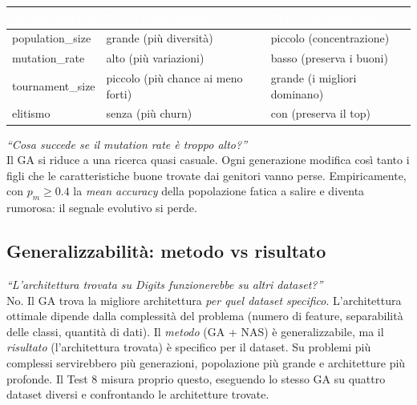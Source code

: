 \documentclass[11pt,a4paper]{article}
\begin{document}
\begin{center}
\begin{tabular}{p{3.4cm} p{4.6cm} p{4.6cm}}
    \toprule
    \rowcolor{headerblue}
    \textcolor{white}{\textbf{Iperparametro}} &
    \textcolor{white}{\textbf{Verso esplorazione}} &
    \textcolor{white}{\textbf{Verso sfruttamento}} \\
    \midrule
    population\_size  & grande (più diversità)        & piccolo (concentrazione) \\
    \rowcolor{rowgray}
    mutation\_rate    & alto (più variazioni)         & basso (preserva i buoni) \\
    tournament\_size  & piccolo (più chance ai meno forti) & grande (i migliori dominano) \\
    \rowcolor{rowgray}
    elitismo          & senza (più churn)             & con (preserva il top) \\
    \bottomrule
\end{tabular}
\end{center}

\begin{domanda}
\textit{``Cosa succede se il mutation rate è troppo alto?''}\\
Il GA si riduce a una ricerca quasi casuale. Ogni generazione modifica
così tanto i figli che le caratteristiche buone trovate dai genitori
vanno perse. Empiricamente, con $p_m \geq 0.4$ la \emph{mean accuracy}
della popolazione fatica a salire e diventa rumorosa: il segnale
evolutivo si perde.
\end{domanda}

\subsection{Generalizzabilità: metodo vs risultato}

\begin{domanda}
\textit{``L'architettura trovata su Digits funzionerebbe su altri dataset?''}\\
No. Il GA trova la migliore architettura \emph{per quel dataset specifico}.
L'architettura ottimale dipende dalla complessità del problema (numero di
feature, separabilità delle classi, quantità di dati). Il \emph{metodo}
(GA + NAS) è generalizzabile, ma il \emph{risultato} (l'architettura
trovata) è specifico per il dataset. Su problemi più complessi servirebbero
più generazioni, popolazione più grande e architetture più profonde. Il
Test 8 misura proprio questo, eseguendo lo stesso GA su quattro dataset
diversi e confrontando le architetture trovate.
\end{domanda}
\end{document}
